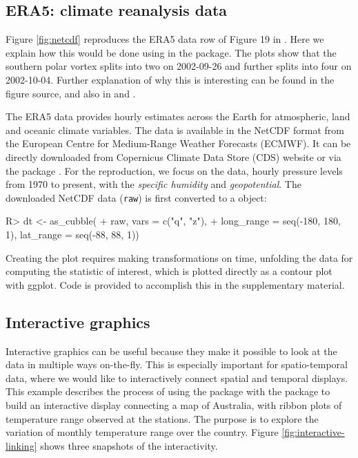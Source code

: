 \documentclass[
  shortnames]{jss}
\begin{document}
\hypertarget{era5-climate-reanalysis-data}{%
\subsection{ERA5: climate reanalysis data}\label{era5-climate-reanalysis-data}}

Figure \ref{fig:netcdf} reproduces the ERA5 data row of Figure 19 in \citet{hersbach2020era5}. Here we explain how this would be done using in the  package. The plots show that the southern polar vortex splits into two on 2002-09-26 and further splits into four on 2002-10-04. Further explanation of why this is interesting can be found in the figure source, and also in \citet{simmons2020global} and \citet{simmons2005ecmwf}.

The ERA5 data \citep{hersbach2020era5} provides hourly estimates across the Earth for atmospheric, land and oceanic climate variables. The data is available in the NetCDF format from the European Centre for Medium-Range Weather Forecasts (ECMWF). It can be directly downloaded from Copernicus Climate Data Store (CDS) \citep{cds} website or via the  package \citep{ecwmfr}. For the reproduction, we focus on the  data, hourly pressure levels from 1970 to present, with the \emph{specific humidity} and \emph{geopotential}. The downloaded NetCDF data (\texttt{raw}) is first converted to a  object:

\begin{CodeChunk}
\begin{CodeInput}
R> dt <- as_cubble(
+   raw, vars = c("q", "z"),
+   long_range = seq(-180, 180, 1), lat_range = seq(-88, 88, 1))
\end{CodeInput}
\end{CodeChunk}

Creating the plot requires making transformations on time, unfolding the data for computing the statistic of interest, which is plotted directly as a contour plot with ggplot. Code is provided to accomplish this in the supplementary material.

\hypertarget{interactive-graphics-1}{%
\subsection{Interactive graphics}\label{interactive-graphics-1}}

Interactive graphics can be useful because they make it possible to look at the data in multiple ways on-the-fly. This is especially important for spatio-temporal data, where we would like to interactively connect spatial and temporal displays. This example describes the process of using the  package with the  package to build an interactive display connecting a map of Australia, with ribbon plots of temperature range observed at the stations. The purpose is to explore the variation of monthly temperature range over the country. Figure \ref{fig:interactive-linking} shows three snapshots of the interactivity.
\end{document}
